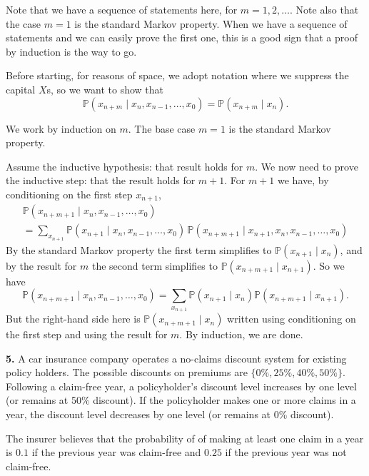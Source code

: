 \documentclass[
  a4paper,
]{article}
\theoremstyle{definition}
\theoremstyle{definition}
\theoremstyle{definition}
\theoremstyle{remark}
\begin{document}
\begin{myanswers}

Note that we have a sequence of statements here, for \(m = 1, 2, \dots\). Note also that the case \(m = 1\) is the standard Markov property. When we have a sequence of statements and we can easily prove the first one, this is a good sign that a proof by induction is the way to go.

Before starting, for reasons of space, we adopt notation where we suppress the capital \(X\)s, so we want to show that
\[ \mathbb P(x_{n+m} \mid x_n, x_{n-1}, \dots, x_0 ) = \mathbb P(x_{n+m} \mid x_n) . \]

We work by induction on \(m\). The base case \(m = 1\) is the standard Markov property.

Assume the inductive hypothesis: that result holds for \(m\). We now need to prove the inductive step: that the result holds for \(m+1\). For \(m+1\) we have, by conditioning on the first step \(x_{n+1}\),
\begin{multline*} \mathbb P(x_{n+m+1} \mid x_n, x_{n-1}, \dots, x_0 ) \\
 = \sum_{x_{n+1}} \mathbb P(x_{n+1} \mid x_n, x_{n-1}, \dots, x_0 )\,\mathbb P(x_{n+m+1} \mid x_{n+1}, x_n, x_{n-1}, \dots, x_0 )     \end{multline*}
By the standard Markov property the first term simplifies to \(\mathbb P(x_{n+1} \mid x_n)\), and by the result for \(m\) the second term simplifies to \(\mathbb P(x_{n+m+1} \mid x_{n+1})\). So we have
\[ \mathbb P(x_{n+m+1} \mid x_n, x_{n-1}, \dots, x_0 ) = \sum_{x_{n+1}} \mathbb P(x_{n+1} \mid x_n) \mathbb P(x_{n+m+1} \mid x_{n+1}) . \]
But the right-hand side here is \(\mathbb P(x_{n+m+1} \mid x_n)\) written using conditioning on the first step and using the result for \(m\). By induction, we are done.

\end{myanswers}

\textbf{5.} A car insurance company operates a no-claims discount system for existing policy holders. The possible discounts on premiums are \(\{0\%,25\%,40\%,50\%\}\). Following a claim-free year, a policyholder's discount level increases by one level (or remains at 50\% discount). If the policyholder makes one or more claims in a year, the discount level decreases by one level (or remains at 0\% discount).

The insurer believes that the probability of of making at least one claim in a year is \(0.1\) if the previous year was claim-free and \(0.25\) if the previous year was not claim-free.
\end{document}
